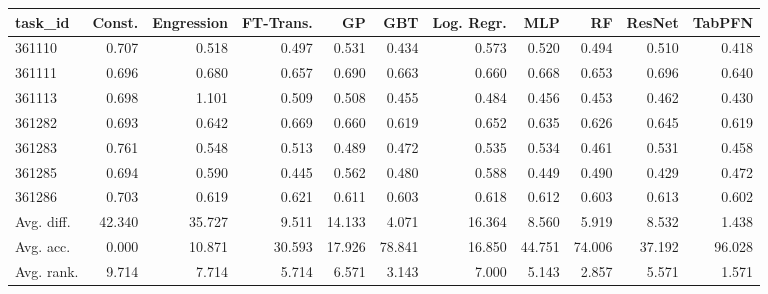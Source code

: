 \begin{tabular}{lrrrrrrrrrr}
\toprule
task\_id & Const. & Engression & FT-Trans. & GP & GBT & Log. Regr. & MLP & RF & ResNet & TabPFN \\
\midrule
361110 & 0.707 & 0.518 & 0.497 & 0.531 & 0.434 & 0.573 & 0.520 & 0.494 & 0.510 & 0.418 \\
361111 & 0.696 & 0.680 & 0.657 & 0.690 & 0.663 & 0.660 & 0.668 & 0.653 & 0.696 & 0.640 \\
361113 & 0.698 & 1.101 & 0.509 & 0.508 & 0.455 & 0.484 & 0.456 & 0.453 & 0.462 & 0.430 \\
361282 & 0.693 & 0.642 & 0.669 & 0.660 & 0.619 & 0.652 & 0.635 & 0.626 & 0.645 & 0.619 \\
361283 & 0.761 & 0.548 & 0.513 & 0.489 & 0.472 & 0.535 & 0.534 & 0.461 & 0.531 & 0.458 \\
361285 & 0.694 & 0.590 & 0.445 & 0.562 & 0.480 & 0.588 & 0.449 & 0.490 & 0.429 & 0.472 \\
361286 & 0.703 & 0.619 & 0.621 & 0.611 & 0.603 & 0.618 & 0.612 & 0.603 & 0.613 & 0.602 \\
Avg. diff. & 42.340 & 35.727 & 9.511 & 14.133 & 4.071 & 16.364 & 8.560 & 5.919 & 8.532 & 1.438 \\
Avg. acc. & 0.000 & 10.871 & 30.593 & 17.926 & 78.841 & 16.850 & 44.751 & 74.006 & 37.192 & 96.028 \\
Avg. rank. & 9.714 & 7.714 & 5.714 & 6.571 & 3.143 & 7.000 & 5.143 & 2.857 & 5.571 & 1.571 \\
\bottomrule
\end{tabular}
